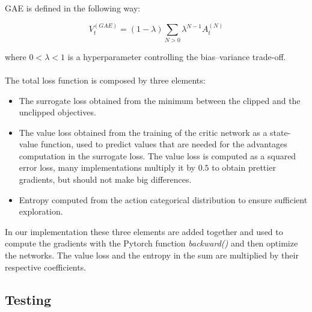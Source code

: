 \documentclass[11pt, a4paper, hidelinks]{report}
\begin{document}
GAE is defined in the following way:

\begin{equation}
	V_t^{(GAE)} = (1 - \lambda)\sum_{N > 0} \lambda^{N - 1}A_t^{(N)}\label{eq:GAE}
\end{equation}

where $0 < \lambda < 1$ is a hyperparameter controlling the bias–variance trade-off.
\\
\\
The total loss function is composed by three elements:
\begin{itemize}
	\item The surrogate loss obtained from the minimum between the clipped and the unclipped objectives.
	\item The value loss obtained from the training of the critic network as a state-value function, used to predict values that are needed for the advantages computation in the surrogate loss.
The value loss is computed as a squared error loss, many implementations multiply it by $0.5$ to obtain prettier gradients, but should not make big differences.
	\item Entropy computed from the action categorical distribution to ensure sufficient exploration.
\end{itemize}

In our implementation these three elements are added together and used to compute the gradients with the Pytorch function \textit{backward()} and then optimize the networks.
The value loss and the entropy in the sum are multiplied by their respective coefficients.

\subsection{Testing}\label{subsec:testing}
\end{document}

